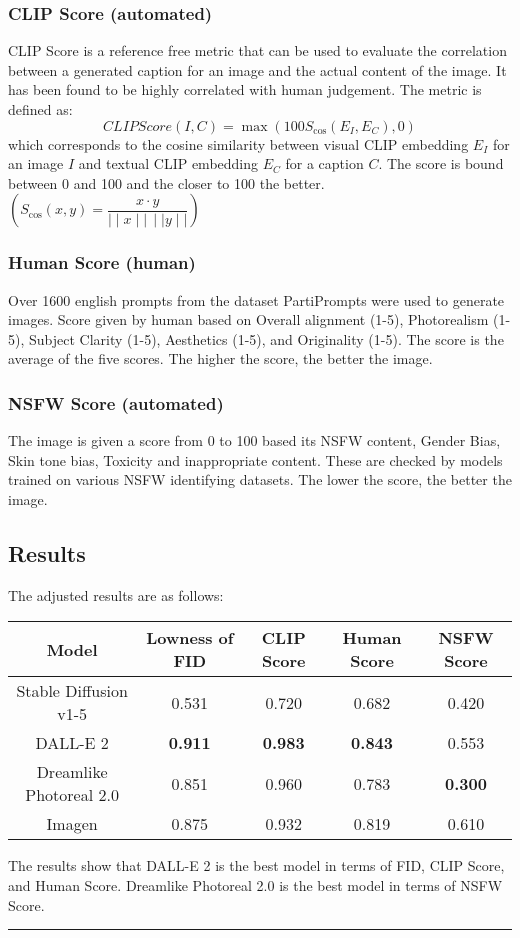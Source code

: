 \documentclass[12pt]{article}
\begin{document}
\subsubsection{CLIP Score (automated)}
CLIP Score is a reference free metric that can be used to evaluate the correlation between a generated caption for an image and the actual content of the image. It has been found to be highly correlated with human judgement. The metric is defined as:
\[CLIPScore(I,C)=\max(100 S_{\cos}(E_I,E_C),0)\]
which corresponds to the cosine similarity between visual CLIP embedding $E_I$ for an image $I$ and textual CLIP embedding $E_C$ for a caption $C$. The score is bound between 0 and 100 and the closer to 100 the better. $\left(S_{\cos}(x,y)=\dfrac{x\cdot y}{\mid\mid x\mid\mid\,\mid\mid y\mid\mid}\right)$
\subsubsection{Human Score (human)}
Over 1600 english prompts from the dataset PartiPrompts were used to generate images. Score given by human based on Overall alignment (1-5), Photorealism (1-5), Subject Clarity (1-5), Aesthetics (1-5), and Originality (1-5). The score is the average of the five scores. The higher the score, the better the image.
\subsubsection{NSFW Score (automated)}
The image is given a score from 0 to 100 based its NSFW content, Gender Bias, Skin tone bias, Toxicity and inappropriate content. These are checked by models trained on various NSFW identifying datasets. The lower the score, the better the image. 
\subsection{Results}
The adjusted results are as follows:
\begin{center}
  \begin{tabular}{c c c c c}
    \hline
    \textbf{Model} & \textbf{Lowness of FID} & \textbf{CLIP Score} & \textbf{Human Score} & \textbf{NSFW Score}\\
    \hline
    Stable Diffusion v1-5 & 0.531 & 0.720 & 0.682 & 0.420\\
    DALL-E 2 & \textbf{0.911} & \textbf{0.983} & \textbf{0.843} & 0.553\\
    Dreamlike Photoreal 2.0 & 0.851 & 0.960 & 0.783 & \textbf{0.300}\\
    Imagen & 0.875 & 0.932 & 0.819 & 0.610\\
    \hline
  \end{tabular}
\end{center}
The results show that DALL-E 2 is the best model in terms of FID, CLIP Score, and Human Score. Dreamlike Photoreal 2.0 is the best model in terms of NSFW Score.\\
\hrule height 2pt \relax
\end{document}
